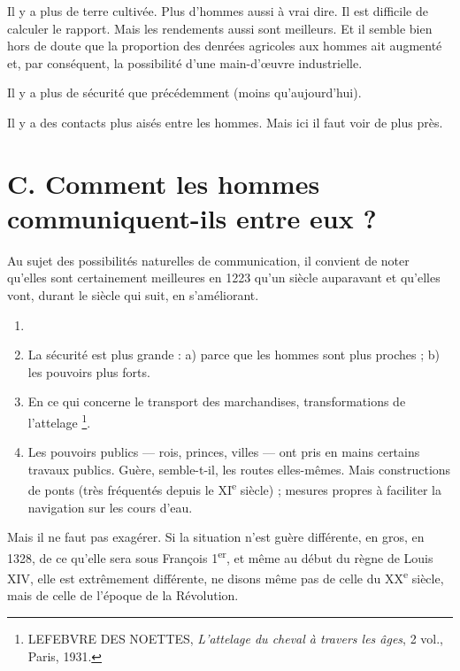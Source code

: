 \documentclass[french,twoside]{book} %
\begin{document}
\begin{listalpha}[itemsep=0pt,]
\item[] \hspace{-1.5em}{\bfseries Or, voyons ce que, pratiquement, cela signifie :}
\item Il y a plus de terre cultivée. Plus d’hommes aussi à vrai dire. Il est difficile de calculer le rapport. Mais les rendements aussi sont meilleurs. Et il semble bien hors de doute que la proportion des denrées agricoles aux hommes ait augmenté et, par conséquent, la possibilité d’une main-d’œuvre industrielle.
\item Il y a plus de sécurité que précédemment (moins qu’aujourd’hui).
\item Il y a des contacts plus aisés entre les hommes. Mais ici il faut voir de plus près.

\end{listalpha}\section[C. Comment les hommes communiquent-ils entre eux ?]{C. Comment les hommes communiquent-ils entre eux ?}
\label{c02c}
\noindent  {}
\label{p10} Au sujet des possibilités naturelles de communication, il convient de noter qu’elles sont certainement meilleures en 1223 qu’un siècle auparavant et qu’elles vont, durant le siècle qui suit, en s’améliorant.\par

\begin{enumerate}[itemsep=0pt,]
\item[] \hspace{-1.5em}{\bfseries Cela pour les raisons qui suivent :}
\item La sécurité est plus grande : a) parce que les hommes sont plus proches ; b) les pouvoirs plus forts.
\item En ce qui concerne le transport des marchandises, transformations de l’attelage \footnote{ LEFEBVRE DES NOETTES, {\itshape L’attelage du cheval à travers les âges}, 2 vol., Paris, 1931.}.
\item Les pouvoirs publics — rois, princes, villes — ont pris en mains certains travaux publics. Guère, semble-t-il, les routes elles-mêmes. Mais constructions de ponts (très fréquentés depuis le XI\textsuperscript{e} siècle) ; mesures propres à faciliter la navigation sur les cours d’eau.

\end{enumerate}\noindent Mais il ne faut pas exagérer. Si la situation n’est guère différente, en gros, en 1328, de ce qu’elle sera sous François 1\textsuperscript{er}, et même au début du règne de Louis XIV, elle est extrêmement différente, ne disons même pas de celle du XX\textsuperscript{e} siècle, mais de celle de l’époque de la Révolution.\par
\end{document}
